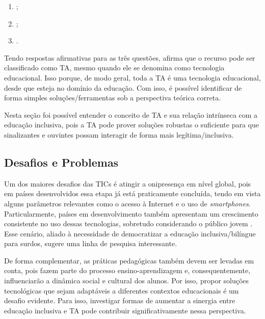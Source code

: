 \begin{enumerate}
\item {} \cite{Bersch2017};
\item {} \cite{Bersch2017};
\item {} \cite{Bersch2017}.
\end{enumerate}

Tendo respostas afirmativas para as três questões,  afirma que o recurso pode ser classificado como TA, mesmo quando ele se denomina como tecnologia educacional. Isso porque, de modo geral, toda a TA é uma tecnologia educacional, desde que esteja no domínio da educação. Com isso, é possível identificar de forma simples soluções/ferramentas sob a perspectiva teórica correta.

Nesta seção foi possível entender o conceito de TA e sua relação intrínseca com a educação inclusiva, pois a TA pode prover soluções robustas o suficiente para que sinalizantes e ouvintes possam interagir de forma mais legítima/inclusiva. %

\subsection{Desafios e Problemas}
\label{fundamentacao-teorica:tic:desafios}

Um dos maiores desafios das TICs é atingir a onipresença em nível global, pois em países desenvolvidos essa etapa já está praticamente concluída, tendo em vista alguns parâmetros relevantes como o acesso à Internet e o uso de \textit{smartphones}. Particularmente, países em desenvolvimento também apresentam um crescimento consistente no uso dessas tecnologias, sobretudo considerando o público jovem \cite{Itu2020}. Esse cenário, aliado à necessidade de democratizar a educação inclusiva/bilíngue para surdos, sugere uma linha de pesquisa interessante.

De forma complementar, as práticas pedagógicas também devem ser levadas em conta, pois fazem parte do processo ensino-aprendizagem e, consequentemente, influenciarão a dinâmica social e cultural dos alunos. Por isso, propor soluções tecnológicas que sejam adaptáveis a diferentes contextos educacionais é um desafio evidente. Para isso, investigar formas de aumentar a sinergia entre educação inclusiva e TA pode contribuir significativamente nessa perspectiva.

